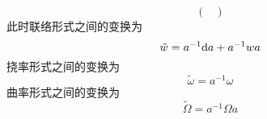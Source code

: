 \begin{proposition}[坐标变换]
\begin{equation}
\begin{pmatrix}
                \end{pmatrix}
            \end{equation}
            此时联络形式之间的变换为
            \begin{equation}\label{eq:Transformation-connection-form}
                \tilde{w} = a^{-1}{\rm d} a + a^{-1}wa
            \end{equation}
            挠率形式之间的变换为
            \begin{equation}\label{eq:Transformation-torsion-form}
                \tilde{\omega} = a^{-1}\omega
            \end{equation}
            曲率形式之间的变换为
            \begin{equation}\label{eq:Transformation-curvature-form}
                \tilde{\Omega} = a^{-1}\Omega a
            \end{equation}
        \end{proposition}
